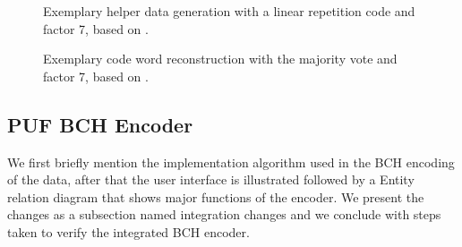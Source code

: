 \begin{figure}[h]
\centering
{}
\caption{Exemplary helper data generation with a linear repetition code and factor 7, based on \cite{10}.}
\label{img:4_LR_HD}
\end{figure}

\begin{figure}[h]
\centering
{}
\caption{Exemplary code word reconstruction with the majority vote and factor 7, based on \cite{10}.}
\label{img:4_MV_codewords}
\end{figure}

\subsection{PUF BCH Encoder}
We first briefly mention the implementation algorithm used in the BCH encoding of the data, after that the user interface is illustrated followed by a Entity relation diagram that shows major functions of the encoder. We present the changes as a subsection named integration changes and we conclude with steps taken to verify the integrated BCH encoder.\\

